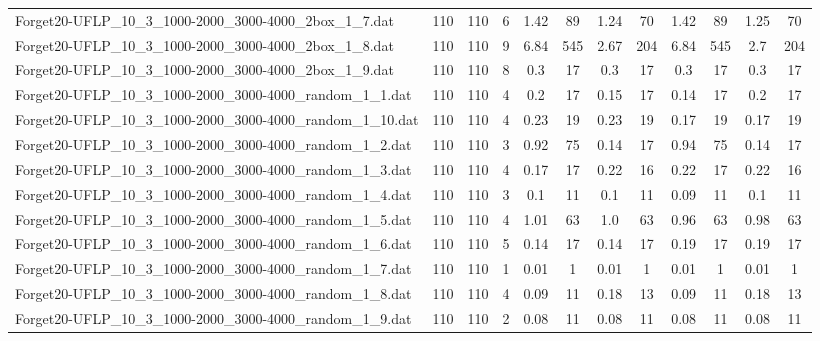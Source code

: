 \begin{sidewaystable}[!ht]
{\begin{tabular}{lccccccccccc}
Forget20-UFLP\_10\_3\_1000-2000\_3000-4000\_2box\_1\_7.dat & 110 & 110 & 6 & 1.42 & 89 &  \textcolor{blue2}{1.24} & 70 & 1.42 & 89 & 1.25 & 70 \\
Forget20-UFLP\_10\_3\_1000-2000\_3000-4000\_2box\_1\_8.dat & 110 & 110 & 9 & 6.84 & 545 &  \textcolor{blue2}{2.67} & 204 & 6.84 & 545 & 2.7 & 204 \\
Forget20-UFLP\_10\_3\_1000-2000\_3000-4000\_2box\_1\_9.dat & 110 & 110 & 8 &  \textcolor{blue2}{0.3} & 17 &  \textcolor{blue2}{0.3} & 17 &  \textcolor{blue2}{0.3} & 17 &  \textcolor{blue2}{0.3} & 17 \\
Forget20-UFLP\_10\_3\_1000-2000\_3000-4000\_random\_1\_1.dat & 110 & 110 & 4 & 0.2 & 17 & 0.15 & 17 &  \textcolor{blue2}{0.14} & 17 & 0.2 & 17 \\
Forget20-UFLP\_10\_3\_1000-2000\_3000-4000\_random\_1\_10.dat & 110 & 110 & 4 & 0.23 & 19 & 0.23 & 19 &  \textcolor{blue2}{0.17} & 19 &  \textcolor{blue2}{0.17} & 19 \\
Forget20-UFLP\_10\_3\_1000-2000\_3000-4000\_random\_1\_2.dat & 110 & 110 & 3 & 0.92 & 75 &  \textcolor{blue2}{0.14} & 17 & 0.94 & 75 &  \textcolor{blue2}{0.14} & 17 \\
Forget20-UFLP\_10\_3\_1000-2000\_3000-4000\_random\_1\_3.dat & 110 & 110 & 4 &  \textcolor{blue2}{0.17} & 17 & 0.22 & 16 & 0.22 & 17 & 0.22 & 16 \\
Forget20-UFLP\_10\_3\_1000-2000\_3000-4000\_random\_1\_4.dat & 110 & 110 & 3 & 0.1 & 11 & 0.1 & 11 &  \textcolor{blue2}{0.09} & 11 & 0.1 & 11 \\
Forget20-UFLP\_10\_3\_1000-2000\_3000-4000\_random\_1\_5.dat & 110 & 110 & 4 & 1.01 & 63 & 1.0 & 63 &  \textcolor{blue2}{0.96} & 63 & 0.98 & 63 \\
Forget20-UFLP\_10\_3\_1000-2000\_3000-4000\_random\_1\_6.dat & 110 & 110 & 5 &  \textcolor{blue2}{0.14} & 17 &  \textcolor{blue2}{0.14} & 17 & 0.19 & 17 & 0.19 & 17 \\
Forget20-UFLP\_10\_3\_1000-2000\_3000-4000\_random\_1\_7.dat & 110 & 110 & 1 &  \textcolor{blue2}{0.01} & 1 &  \textcolor{blue2}{0.01} & 1 &  \textcolor{blue2}{0.01} & 1 &  \textcolor{blue2}{0.01} & 1 \\
Forget20-UFLP\_10\_3\_1000-2000\_3000-4000\_random\_1\_8.dat & 110 & 110 & 4 &  \textcolor{blue2}{0.09} & 11 & 0.18 & 13 &  \textcolor{blue2}{0.09} & 11 & 0.18 & 13 \\
Forget20-UFLP\_10\_3\_1000-2000\_3000-4000\_random\_1\_9.dat & 110 & 110 & 2 &  \textcolor{blue2}{0.08} & 11 &  \textcolor{blue2}{0.08} & 11 &  \textcolor{blue2}{0.08} & 11 &  \textcolor{blue2}{0.08} & 11 \\

\end{tabular}}
\end{sidewaystable}
